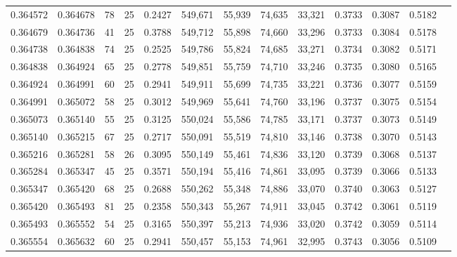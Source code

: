 \begin{tabular}{rrrrrrrrrrrrr}
0.364572 & 0.364678 &    78 &  25 &                                     0.2427 & 549,671 &  55,939 &  74,635 &  33,321 & 0.3733 & 0.3087 & 0.5182 \\
0.364679 & 0.364736 &    41 &  25 &                                     0.3788 & 549,712 &  55,898 &  74,660 &  33,296 & 0.3733 & 0.3084 & 0.5178 \\
0.364738 & 0.364838 &    74 &  25 &                                     0.2525 & 549,786 &  55,824 &  74,685 &  33,271 & 0.3734 & 0.3082 & 0.5171 \\
0.364838 & 0.364924 &    65 &  25 &                                     0.2778 & 549,851 &  55,759 &  74,710 &  33,246 & 0.3735 & 0.3080 & 0.5165 \\
0.364924 & 0.364991 &    60 &  25 &                                     0.2941 & 549,911 &  55,699 &  74,735 &  33,221 & 0.3736 & 0.3077 & 0.5159 \\
0.364991 & 0.365072 &    58 &  25 &                                     0.3012 & 549,969 &  55,641 &  74,760 &  33,196 & 0.3737 & 0.3075 & 0.5154 \\
0.365073 & 0.365140 &    55 &  25 &                                     0.3125 & 550,024 &  55,586 &  74,785 &  33,171 & 0.3737 & 0.3073 & 0.5149 \\
0.365140 & 0.365215 &    67 &  25 &                                     0.2717 & 550,091 &  55,519 &  74,810 &  33,146 & 0.3738 & 0.3070 & 0.5143 \\
0.365216 & 0.365281 &    58 &  26 &                                     0.3095 & 550,149 &  55,461 &  74,836 &  33,120 & 0.3739 & 0.3068 & 0.5137 \\
0.365284 & 0.365347 &    45 &  25 &                                     0.3571 & 550,194 &  55,416 &  74,861 &  33,095 & 0.3739 & 0.3066 & 0.5133 \\
0.365347 & 0.365420 &    68 &  25 &                                     0.2688 & 550,262 &  55,348 &  74,886 &  33,070 & 0.3740 & 0.3063 & 0.5127 \\
0.365420 & 0.365493 &    81 &  25 &                                     0.2358 & 550,343 &  55,267 &  74,911 &  33,045 & 0.3742 & 0.3061 & 0.5119 \\
0.365493 & 0.365552 &    54 &  25 &                                     0.3165 & 550,397 &  55,213 &  74,936 &  33,020 & 0.3742 & 0.3059 & 0.5114 \\
0.365554 & 0.365632 &    60 &  25 &                                     0.2941 & 550,457 &  55,153 &  74,961 &  32,995 & 0.3743 & 0.3056 & 0.5109 \\

\end{tabular}
